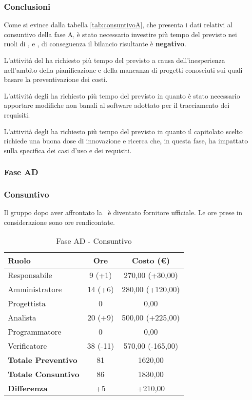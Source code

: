 \documentclass[../PianoProgetto.tex]{subfiles}
\begin{document}
		\subsubsection{Conclusioni}	
		Come si evince dalla tabella \ref{tab:consuntivoA}, che presenta i dati relativi al consuntivo della fase A, è stato necessario investire più tempo del previsto nei ruoli di \responsabilediprogetto{}, \amministratore{} e \analista, di conseguenza il bilancio risultante è \textbf{negativo}.
		
		L'attività del \responsabilediprogetto{} ha richiesto più tempo del previsto a causa dell'inesperienza nell'ambito della pianificazione e della mancanza di progetti conosciuti sui quali basare la preventivazione dei costi.		
		
		L'attività degli \amministratori{} ha richiesto più tempo del previsto in quanto è stato necessario apportare modifiche non banali al software adottato per il tracciamento dei requisiti.
		
		L'attività degli \analisti{} ha richiesto più tempo del previsto in quanto il capitolato scelto richiede una buona dose di innovazione e ricerca che, in questa fase, ha impattato sulla specifica dei casi d'uso e dei requisiti.

	\subsubsection{Fase AD}
	\subsubsection{Consuntivo}
	Il gruppo dopo aver affrontato la \revisionedeirequisiti\ è diventato fornitore ufficiale. Le ore prese in considerazione sono ore rendicontate. 
	
	\begin{table}[h]
		\centering
		\begin{tabular}{l * {2}{c}}
			\toprule
			\textbf{Ruolo} & \textbf{Ore} & \textbf{Costo (\euro{})} \\
			\midrule
			Responsabile &	9 (+1) & 270,00 (+30,00)\\
			Amministratore &  14 (+6) & 280,00 (+120,00)\\
			Progettista & 0 & 0,00 \\
			Analista & 20 (+9) & 500,00 (+225,00)\\
			Programmatore & 0 & 0,00 \\
			Verificatore & 38 (-11) & 570,00 (-165,00)\\
			\midrule
			\textbf{Totale Preventivo} & 81
			& 1620,00
			\\		
			\textbf{Totale Consuntivo} & 86 & 1830,00 
			\\
			\midrule
			\textbf{Differenza} & +5 & +210,00 \\
			\bottomrule
		\end{tabular}
		
		\caption{Fase AD - Consuntivo}
		\label{tab:consuntivoAD}
		
	\end{table}		
	
\end{document}
